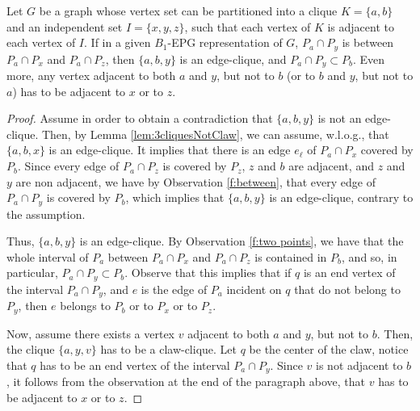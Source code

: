 \documentclass{dmgt}
\begin{document}
\begin{lemma}\label{l:abclique}
Let $G$ be a graph whose vertex set  can be partitioned into a clique $K=\{a,b\}$ and an independent set $I=\{x,y,z\}$, such that each vertex of $K$ is adjacent to each vertex of $I$.
If in a given $B_1$-EPG representation of $G$, $P_a\cap P_y$ is between $P_a\cap P_x$ and $P_a\cap P_z$, then $\{a,b,y\}$ is an edge-clique, and
$P_a\cap P_y \subset P_b$. Even more, any vertex adjacent to both $a$ and $y$, but not to $b$ (or to $b$ and $y$, but not to $a$) has to be adjacent to $x$ or to $z$.
\end{lemma}

\begin{proof}
Assume in order to obtain a contradiction that $\{a,b,y\}$ is not an edge-clique. Then, by Lemma
\ref{lem:3cliquesNotClaw}, we can assume, w.l.o.g., that $\{a,b,x\}$ is an edge-clique.
It implies that there is an edge $e_{\ell}$ of $P_a \cap P_x$ covered by $P_b$. Since every  edge
of $P_a\cap P_z$ is covered  by $P_z$, $z$ and $b$ are adjacent, and $z$ and $y$ are non adjacent, we have by Observation \ref{f:between},
that every edge of $P_a\cap P_y$ is covered by $P_b$, which implies  that $\{a,b,y\}$ is an edge-clique, contrary to the assumption.

Thus, $\{a,b,y\}$ is an edge-clique. By Observation \ref{f:two points}, we have that the whole interval of $P_a$ between 
 $P_a \cap P_x$ and   $P_a \cap P_z$ is contained in $P_b$, and so, in particular, $P_a\cap P_y \subset P_b$. Observe that this
 implies that if $q$ is an end vertex of the interval $P_a \cap P_y$, and $e$ is the edge of $P_a$ incident on $q$ that do not belong to $P_y$, then 
$e$ belongs to $P_b$ or to $P_x$ or to $P_z$.
 
 Now, assume there exists a vertex $v$ adjacent to both $a$ and $y$, but not to $b$. Then, the clique $\{a,y,v\}$ has to be a claw-clique. Let $q$ be the center of the claw, notice that $q$ has to be an end vertex of the interval $P_a \cap P_y$.
 Since $v$ is not adjacent to $b$, it follows from the observation at the end of the paragraph above, that
 $v$ has to be adjacent to $x$ or to $z$.


\end{proof}
\end{document}
